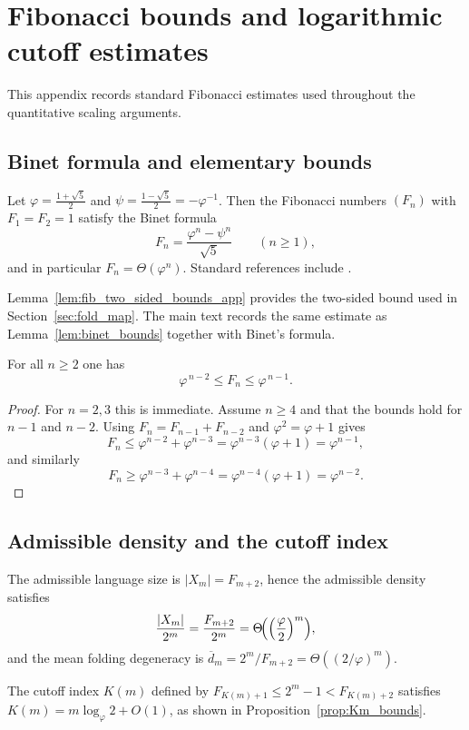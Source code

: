 
\section{Fibonacci bounds and logarithmic cutoff estimates}
\label{app:fibonacci_bounds}

This appendix records standard Fibonacci estimates used throughout the quantitative scaling arguments.

\subsection{Binet formula and elementary bounds}
Let $\varphi=\frac{1+\sqrt{5}}{2}$ and $\psi=\frac{1-\sqrt{5}}{2}=-\varphi^{-1}$.
Then the Fibonacci numbers $(F_n)$ with $F_1=F_2=1$ satisfy the Binet formula
\[
F_n=\frac{\varphi^n-\psi^n}{\sqrt{5}}
\qquad (n\ge 1),
\]
and in particular $F_n=\Theta(\varphi^n)$.
Standard references include \cite{Koshy2001}.

\begin{remark}
Lemma~\ref{lem:fib_two_sided_bounds_app} provides the two-sided bound used in Section~\ref{sec:fold_map}.
The main text records the same estimate as Lemma~\ref{lem:binet_bounds} together with Binet's formula.
\end{remark}

\begin{lemma}
\label{lem:fib_two_sided_bounds_app}
For all $n\ge 2$ one has
\[
\varphi^{\,n-2}\le F_n\le \varphi^{\,n-1}.
\]
\end{lemma}

\begin{proof}
For $n=2,3$ this is immediate.
Assume $n\ge 4$ and that the bounds hold for $n-1$ and $n-2$.
Using $F_n=F_{n-1}+F_{n-2}$ and $\varphi^2=\varphi+1$ gives
\[
F_n\le \varphi^{n-2}+\varphi^{n-3}=\varphi^{n-3}(\varphi+1)=\varphi^{n-1},
\]
and similarly
\[
F_n\ge \varphi^{n-3}+\varphi^{n-4}=\varphi^{n-4}(\varphi+1)=\varphi^{n-2}.
\]
\end{proof}

\subsection{Admissible density and the cutoff index}
The admissible language size is $|X_m|=F_{m+2}$, hence the admissible density satisfies
\[
\frac{|X_m|}{2^m}=\frac{F_{m+2}}{2^m}=\Theta\!\Bigl(\Bigl(\frac{\varphi}{2}\Bigr)^m\Bigr),
\]
and the mean folding degeneracy is $\overline{d}_m=2^m/F_{m+2}=\Theta((2/\varphi)^m)$.

The cutoff index $K(m)$ defined by $F_{K(m)+1}\le 2^m-1<F_{K(m)+2}$ satisfies $K(m)=m\log_\varphi 2+O(1)$, as shown in Proposition~\ref{prop:Km_bounds}.


